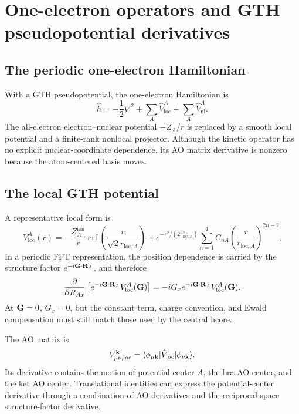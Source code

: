 \section{One-electron operators and GTH pseudopotential derivatives}
\label{sec:gth-one-electron}

\subsection{The periodic one-electron Hamiltonian}

With a GTH pseudopotential, the one-electron Hamiltonian is
\begin{equation}
  \hat h
  =-\frac12\nabla^2
   +\sum_A\hat V_{\mathrm{loc}}^A
   +\sum_A\hat V_{\mathrm{nl}}^A.
  \label{eq:gth-hamiltonian}
\end{equation}
The all-electron electron--nuclear potential $-Z_A/r$ is replaced by a smooth
local potential and a finite-rank nonlocal projector.  Although the kinetic
operator has no explicit nuclear-coordinate dependence, its AO matrix
derivative is nonzero because the atom-centered basis moves.

\subsection{The local GTH potential}

A representative local form is
\begin{equation}
  V_{\mathrm{loc}}^A(r)
  =-\frac{Z_A^{\mathrm{ion}}}{r}
    \operatorname{erf}\!\left(\frac{r}{\sqrt2 r_{\mathrm{loc},A}}\right)
   +e^{-r^2/(2r_{\mathrm{loc},A}^2)}
    \sum_{n=1}^{4}C_{nA}
    \left(\frac{r}{r_{\mathrm{loc},A}}\right)^{2n-2}.
  \label{eq:gth-local-real}
\end{equation}
In a periodic FFT representation, the position dependence is carried by the
structure factor $e^{-i\mathbf{G}\cdot\mathbf R_A}$, and therefore
\begin{equation}
  \frac{\partial}{\partial R_{Ax}}
  \left[e^{-i\mathbf{G}\cdot\mathbf R_A}V_{\mathrm{loc}}^A(\mathbf{G})\right]
  =-iG_xe^{-i\mathbf{G}\cdot\mathbf R_A}V_{\mathrm{loc}}^A(\mathbf{G}).
  \label{eq:gth-local-structure-derivative}
\end{equation}
At $\mathbf{G}=0$, $G_x=0$, but the constant term, charge convention, and Ewald
compensation must still match those used by the central hcore.

The AO matrix is
\begin{equation}
  V_{\mu\nu,\mathrm{loc}}^{\mathbf{k}}
  =\langle\phi_{\mu\mathbf{k}}|\hat V_{\mathrm{loc}}|\phi_{\nu\mathbf{k}}\rangle.
  \label{eq:gth-local-ao}
\end{equation}
Its derivative contains the motion of potential center $A$, the bra AO center,
and the ket AO center.  Translational identities can express the
potential-center derivative through a combination of AO derivatives and the
reciprocal-space structure-factor derivative.

